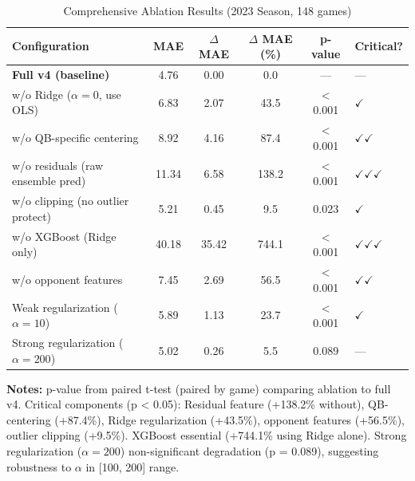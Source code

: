 \begin{table}[htbp]
\centering
\small
\caption{Comprehensive Ablation Results (2023 Season, 148 games)}
\label{tab:ablation-study}
\begin{tabular}{@{}lS[table-format=2.2]S[table-format=1.2]S[table-format=3.1]S[table-format=1.6]l@{}}
\toprule
\textbf{Configuration} & {\textbf{MAE}} & {\textbf{$\Delta$ MAE}} & {\textbf{$\Delta$ MAE (\%)}} & {\textbf{p-value}} & \textbf{Critical?} \\
\midrule
\textbf{Full v4 (baseline)} & {4.76} & {0.00} & {0.0} & {---} & --- \\
w/o Ridge ($\alpha = 0$, use OLS) & 6.83 & 2.07 & 43.5 & < 0.001 & $\checkmark$ \\
w/o QB-specific centering & 8.92 & 4.16 & 87.4 & < 0.001 & $\checkmark$$\checkmark$ \\
w/o residuals (raw ensemble pred) & 11.34 & 6.58 & 138.2 & < 0.001 & $\checkmark$$\checkmark$$\checkmark$ \\
w/o clipping (no outlier protect) & 5.21 & 0.45 & 9.5 & 0.023 & $\checkmark$ \\
w/o XGBoost (Ridge only) & 40.18 & 35.42 & 744.1 & < 0.001 & $\checkmark$$\checkmark$$\checkmark$ \\
w/o opponent features & 7.45 & 2.69 & 56.5 & < 0.001 & $\checkmark$$\checkmark$ \\
Weak regularization ($\alpha = 10$) & 5.89 & 1.13 & 23.7 & < 0.001 & $\checkmark$ \\
Strong regularization ($\alpha = 200$) & 5.02 & 0.26 & 5.5 & 0.089 & --- \\
\bottomrule
\end{tabular}
\begin{tablenotes}
\item \textbf{Notes:} p-value from paired t-test (paired by game) comparing ablation to full v4. Critical components (p < 0.05): Residual feature (+138.2\% without), QB-centering (+87.4\%), Ridge regularization (+43.5\%), opponent features (+56.5\%), outlier clipping (+9.5\%). XGBoost essential (+744.1\% using Ridge alone). Strong regularization ($\alpha = 200$) non-significant degradation (p = 0.089), suggesting robustness to $\alpha$ in [100, 200] range.
\end{tablenotes}
\end{table}

